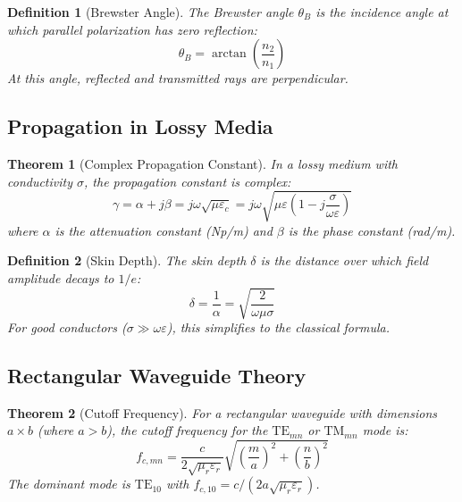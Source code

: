 \documentclass[a4paper, 11pt]{article}
\newtheorem{definition}{Definition}[section]
\newtheorem{theorem}{Theorem}[section]
\begin{document}
\begin{definition}[Brewster Angle]
The Brewster angle $\theta_B$ is the incidence angle at which parallel polarization
has zero reflection:
\begin{equation}
\theta_B = \arctan\left(\frac{n_2}{n_1}\right)
\end{equation}
At this angle, reflected and transmitted rays are perpendicular.
\end{definition}

\subsection{Propagation in Lossy Media}

\begin{theorem}[Complex Propagation Constant]
In a lossy medium with conductivity $\sigma$, the propagation constant is complex:
\begin{equation}
\gamma = \alpha + j\beta = j\omega\sqrt{\mu\varepsilon_c} = j\omega\sqrt{\mu\varepsilon\left(1 - j\frac{\sigma}{\omega\varepsilon}\right)}
\end{equation}
where $\alpha$ is the attenuation constant (Np/m) and $\beta$ is the phase constant (rad/m).
\end{theorem}

\begin{definition}[Skin Depth]
The skin depth $\delta$ is the distance over which field amplitude decays to $1/e$:
\begin{equation}
\delta = \frac{1}{\alpha} = \sqrt{\frac{2}{\omega\mu\sigma}}
\end{equation}
For good conductors ($\sigma \gg \omega\varepsilon$), this simplifies to the classical formula.
\end{definition}

\subsection{Rectangular Waveguide Theory}

\begin{theorem}[Cutoff Frequency]
For a rectangular waveguide with dimensions $a \times b$ (where $a > b$), the cutoff
frequency for the $\text{TE}_{mn}$ or $\text{TM}_{mn}$ mode is:
\begin{equation}
f_{c,mn} = \frac{c}{2\sqrt{\mu_r\varepsilon_r}} \sqrt{\left(\frac{m}{a}\right)^2 + \left(\frac{n}{b}\right)^2}
\end{equation}
The dominant mode is $\text{TE}_{10}$ with $f_{c,10} = c/(2a\sqrt{\mu_r\varepsilon_r})$.
\end{theorem}
\end{document}

